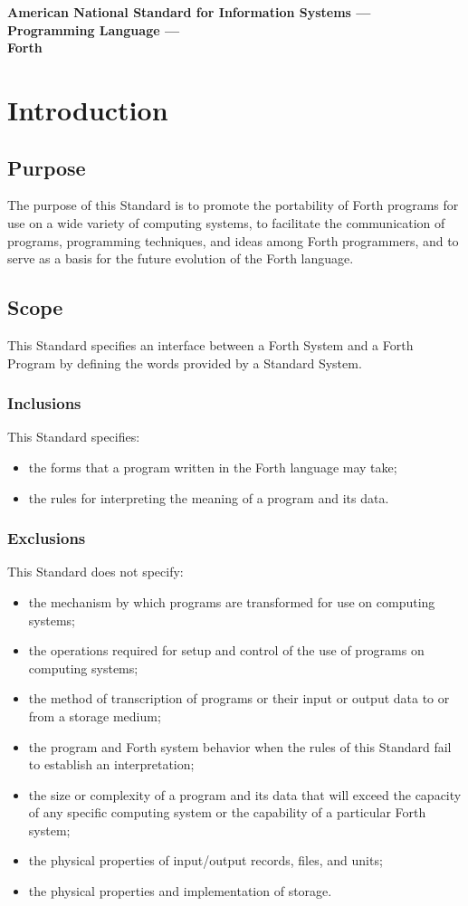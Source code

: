 {\Large\bfseries
American National Standard for Information Systems --- \\[2pt]
Programming Language --- \\[2pt]
Forth
}

\chapter{Introduction}

\section{Purpose}
The purpose of this Standard is to promote the portability of Forth
programs for use on a wide variety of computing systems, to facilitate
the communication of programs, programming techniques, and ideas among
Forth programmers, and to serve as a basis for the future evolution of
the Forth language.

\section{Scope}
This Standard specifies an interface between a Forth System and a
Forth Program by defining the words provided by a Standard System.

\subsection{Inclusions}
This Standard specifies:
\begin{itemize}
\item the forms that a program written in the Forth language may take;
\item the rules for interpreting the meaning of a program and its data.
\end{itemize}

\subsection{Exclusions} %
\label{intro:exclusions}

This Standard does not specify:
\begin{itemize}
\item the mechanism by which programs are transformed for use on
	computing systems;
\item the operations required for setup and control of the use of
	programs on computing systems;
\item the method of transcription of programs or their input or
	output data to or from a storage medium;
\item the program and Forth system behavior when the rules of this
	Standard fail to establish an interpretation;
\item the size or complexity of a program and its data that will
	exceed the capacity of any specific computing system or the
	capability of a particular Forth system;
\item the physical properties of input/output records, files, and units;
\item the physical properties and implementation of storage.
\end{itemize}

